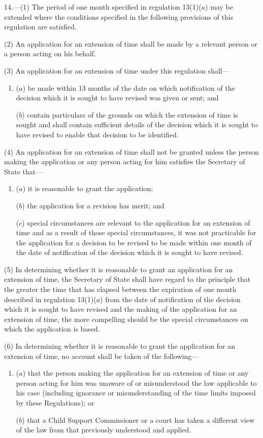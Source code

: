 \documentclass[12pt,a4paper]{article}
\begin{document}
14.—(1) The period of one month specified in regulation 13(1)($a$) may be extended where the conditions specified in the following provisions of this regulation are satisfied.

(2) An application for an extension of time shall be made by a relevant person or a person acting on his behalf.

(3) An application for an extension of time under this regulation shall—
\begin{enumerate}\item[]
($a$) be made within 13 months of the date on which notification of the decision which it is sought to have revised was given or sent; and

($b$) contain particulars of the grounds on which the extension of time is sought and shall contain sufficient details of the decision which it is sought to have revised to enable that decision to be identified.
\end{enumerate}

(4) An application for an extension of time shall not be granted unless the person making the application or any person acting for him satisfies the Secretary of State that—
\begin{enumerate}\item[]
($a$) it is reasonable to grant the application;

($b$) the application for a revision has merit; and

($c$) special circumstances are relevant to the application for an extension of time and as a result of those special circumstances, it was not practicable for the application for a decision to be revised to be made within one month of the date of notification of the decision which it is sought to have revised.
\end{enumerate}

(5) In determining whether it is reasonable to grant an application for an extension of time, the Secretary of State shall have regard to the principle that the greater the time that has elapsed between the expiration of one month described in regulation 13(1)($a$) from the date of notification of the decision which it is sought to have revised and the making of the application for an extension of time, the more compelling should be the special circumstances on which the application is based.

(6) In determining whether it is reasonable to grant the application for an extension of time, no account shall be taken of the following—
\begin{enumerate}\item[]
($a$) that the person making the application for an extension of time or any person acting for him was unaware of or misunderstood the law applicable to his case (including ignorance or misunderstanding of the time limits imposed by these Regulations); or

($b$) that a Child Support Commissioner or a court has taken a different view of the law from that previously understood and applied.
\end{enumerate}
\end{document}
